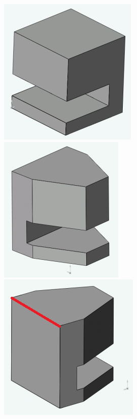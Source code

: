 \begin{minipage}{0.23\linewidth}
\includegraphics[width=0.7\linewidth]{img/011} \\ \vfill
\includegraphics[width=0.7\linewidth]{img/013} \\ \vfill
\includegraphics[width=0.7\linewidth]{img/014}
\end{minipage}

